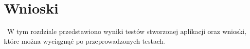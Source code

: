 \chapter{Wnioski}
\label{cha:wnioski}
~W tym rozdziale przedstawiono wyniki testów stworzonej aplikacji oraz wnioski, które można wyciągnąć po przeprowadzonych testach.
